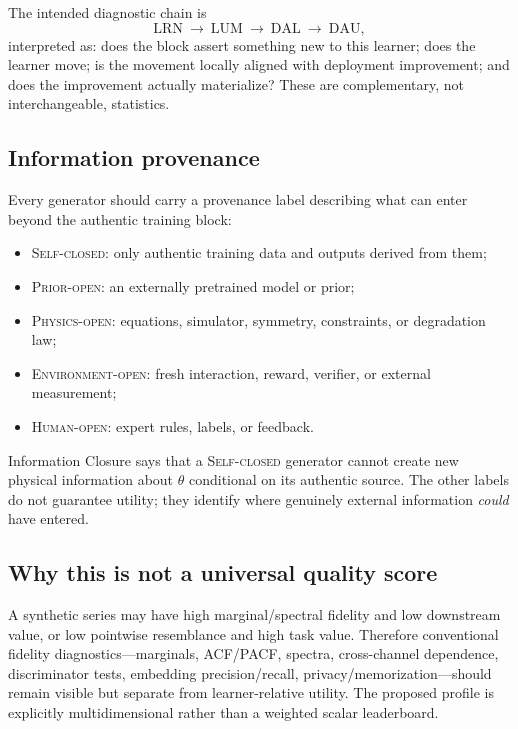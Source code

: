 The intended diagnostic chain is
\[
\boxed{\mathrm{LRN}\ \longrightarrow\ \mathrm{LUM}\ \longrightarrow\ \mathrm{DAL}\ \longrightarrow\ \mathrm{DAU}},
\]
interpreted as: does the block assert something new to this learner; does the learner move; is the movement locally aligned with deployment improvement; and does the improvement actually materialize? These are complementary, not interchangeable, statistics.

\subsection{Information provenance}
Every generator should carry a provenance label describing what can enter beyond the authentic training block:
\begin{itemize}
\item \textsc{Self-closed}: only authentic training data and outputs derived from them;
\item \textsc{Prior-open}: an externally pretrained model or prior;
\item \textsc{Physics-open}: equations, simulator, symmetry, constraints, or degradation law;
\item \textsc{Environment-open}: fresh interaction, reward, verifier, or external measurement;
\item \textsc{Human-open}: expert rules, labels, or feedback.
\end{itemize}
Information Closure says that a \textsc{Self-closed} generator cannot create new physical information about $\theta$ conditional on its authentic source. The other labels do not guarantee utility; they identify where genuinely external information \emph{could} have entered.

\subsection{Why this is not a universal quality score}
A synthetic series may have high marginal/spectral fidelity and low downstream value, or low pointwise resemblance and high task value. Therefore conventional fidelity diagnostics---marginals, ACF/PACF, spectra, cross-channel dependence, discriminator tests, embedding precision/recall, privacy/memorization---should remain visible but separate from learner-relative utility. The proposed profile is explicitly multidimensional rather than a weighted scalar leaderboard.
